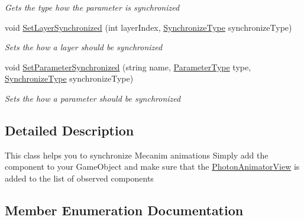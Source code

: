 \begin{DoxyCompactItemize}
\begin{DoxyCompactList}\small\item\em Gets the type how the parameter is synchronized \end{DoxyCompactList}\item 
void \hyperlink{class_photon_animator_view_a1ee474865e5e736760591b1c50644413}{Set\+Layer\+Synchronized} (int layer\+Index, \hyperlink{class_photon_animator_view_ae3ad07de936a811cbb923adffe1f167f}{Synchronize\+Type} synchronize\+Type)
\begin{DoxyCompactList}\small\item\em Sets the how a layer should be synchronized \end{DoxyCompactList}\item 
void \hyperlink{class_photon_animator_view_a4baf9e4d43b5cd41c0a1e0514ec63829}{Set\+Parameter\+Synchronized} (string name, \hyperlink{class_photon_animator_view_aa41dc91e8da385b9f10cf9bf5dc47894}{Parameter\+Type} type, \hyperlink{class_photon_animator_view_ae3ad07de936a811cbb923adffe1f167f}{Synchronize\+Type} synchronize\+Type)
\begin{DoxyCompactList}\small\item\em Sets the how a parameter should be synchronized \end{DoxyCompactList}\end{DoxyCompactItemize}


\subsection{Detailed Description}
This class helps you to synchronize Mecanim animations Simply add the component to your Game\+Object and make sure that the \hyperlink{class_photon_animator_view}{Photon\+Animator\+View} is added to the list of observed components 



\subsection{Member Enumeration Documentation}
